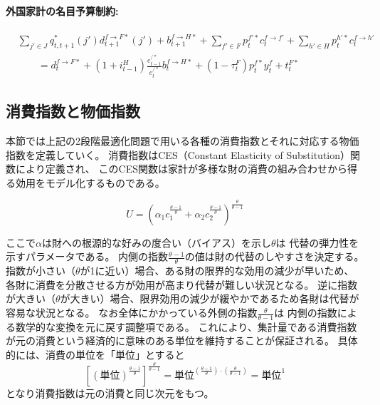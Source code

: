 \paragraph{外国家計の名目予算制約:}
\label{sec:model_households_optimization_foreign_budget}
\begin{equation}
\label{form:model_households_optimization_foreign_budget_equation}
    \begin{aligned}
        &\sum_{j'\in J}q_{t,t+1}^*(j')d_{t+1}^{f\to F*}(j')+b_{t+1}^{f\to H*}+\sum_{f'\in F}p_t^{f'*}c_t^{f\to f'}+\sum_{h'\in H}p_t^{h'*}c_t^{f\to h'} \\
        &\qquad=d_t^{f\to F*}+(1+i_{t-1}^H)\frac{e_{t-1}^{/*}}{e_t^{/*}}b_t^{f\to H*}+(1-\tau_t^F)p_t^{f*}y_t^f+t_t^{F*}
    \end{aligned}
\end{equation}

\subsection{消費指数と物価指数}
\label{sec:model_households_indices}
本節では上記の2段階最適化問題で用いる各種の消費指数とそれに対応する物価指数を定義していく。
消費指数はCES（Constant Elasticity of Substitution）関数により定義され、
このCES関数は家計が多様な財の消費の組み合わせから得る効用をモデル化するものである。

\begin{equation}
\label{form:model_households_indices_ces_eq}
    U=\left(\alpha_1c_1^{\frac{\theta-1}{\theta}}+\alpha_2c_2^{\frac{\theta-1}{\theta}}\right)^{\frac{\theta}{\theta-1}}
\end{equation}

ここで\(\alpha\)は財への根源的な好みの度合い（バイアス）を示し\(\theta\)は
代替の弾力性を示すパラメータである。
内側の指数\(\frac{\theta-1}{\theta}\)の値は財の代替のしやすさを決定する。
指数が小さい（\(\theta\)が1に近い）場合、ある財の限界的な効用の減少が早いため、
各財に消費を分散させる方が効用が高まり代替が難しい状況となる。
逆に指数が大きい（\(\theta\)が大きい）場合、限界効用の減少が緩やかであるため各財は代替が容易な状況となる。
なお全体にかかっている外側の指数\(\frac{\theta}{\theta-1}\)は
内側の指数による数学的な変換を元に戻す調整項である。
これにより、集計量である消費指数が元の消費という経済的に意味のある単位を維持することが保証される。
具体的には、消費の単位を「単位」とすると
\begin{equation}
\label{form:model_households_indices_ces_units}
    \left[(\text{単位})^{\frac{\theta-1}{\theta}}\right]^{\frac{\theta}{\theta-1}}=\text{単位}^{(\frac{\theta-1}{\theta})\cdot(\frac{\theta}{\theta-1})}=\text{単位}^1
\end{equation}
となり消費指数は元の消費と同じ次元をもつ。

